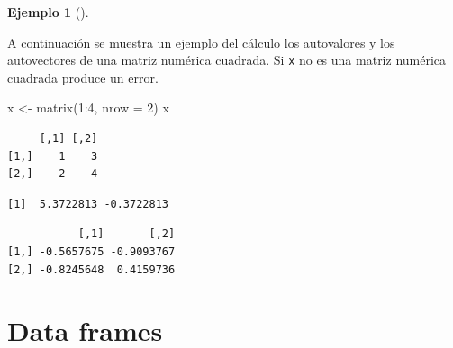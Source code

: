 \documentclass[
  a4paper,
]{scrreport}
\newenvironment{Shaded}{\begin{snugshade}}{\end{snugshade}}
\newcommand{\AttributeTok}[1]{\textcolor[rgb]{0.40,0.45,0.13}{#1}}
\newcommand{\CommentTok}[1]{\textcolor[rgb]{0.37,0.37,0.37}{#1}}
\newcommand{\DecValTok}[1]{\textcolor[rgb]{0.68,0.00,0.00}{#1}}
\newcommand{\FunctionTok}[1]{\textcolor[rgb]{0.28,0.35,0.67}{#1}}
\newcommand{\NormalTok}[1]{\textcolor[rgb]{0.00,0.23,0.31}{#1}}
\newcommand{\OtherTok}[1]{\textcolor[rgb]{0.00,0.23,0.31}{#1}}
\newcommand{\SpecialCharTok}[1]{\textcolor[rgb]{0.37,0.37,0.37}{#1}}
\theoremstyle{definition}
\theoremstyle{definition}
\newtheorem{example}{Ejemplo}[chapter]
\theoremstyle{remark}
\begin{document}
\leavevmode{}%
\begin{example}[]\label{exm-autovalores-autovectores}

A continuación se muestra un ejemplo del cálculo los autovalores y los
autovectores de una matriz numérica cuadrada. Si \texttt{x} no es una
matriz numérica cuadrada produce un error.

\begin{Shaded}
\begin{Highlighting}[]
\NormalTok{x }\OtherTok{\textless{}{-}} \FunctionTok{matrix}\NormalTok{(}\DecValTok{1}\SpecialCharTok{:}\DecValTok{4}\NormalTok{, }\AttributeTok{nrow =} \DecValTok{2}\NormalTok{)}
\NormalTok{x}
\end{Highlighting}
\end{Shaded}

\begin{verbatim}
     [,1] [,2]
[1,]    1    3
[2,]    2    4
\end{verbatim}

\begin{Shaded}
\end{Shaded}

\begin{verbatim}
[1]  5.3722813 -0.3722813
\end{verbatim}

\begin{Shaded}
\end{Shaded}

\begin{verbatim}
           [,1]       [,2]
[1,] -0.5657675 -0.9093767
[2,] -0.8245648  0.4159736
\end{verbatim}

\end{example}

\hypertarget{data-frames}{%
\section{Data frames}\label{data-frames}}
\end{document}

